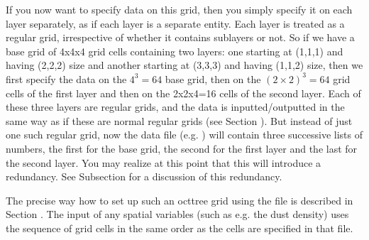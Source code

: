 \documentclass[letterpaper,10pt,english]{sphinxmanual}
\begin{document}
If you now want to specify data on this grid, then you simply specify it on
each layer separately, as if each layer is a separate entity. Each layer is
treated as a regular grid, irrespective of whether it contains sub\sphinxhyphen{}layers
or not. So if we have a base grid of 4x4x4 grid cells containing two layers:
one starting at (1,1,1) and having (2,2,2) size and another starting at
(3,3,3) and having (1,1,2) size, then we first specify the data on the
\(4^3=64\) base grid, then on the \((2\times 2)^3=64\) grid cells of the first
layer and then on the 2x2x4=16 cells of the second layer. Each of these
three layers are regular grids, and the data is inputted/outputted in
the same way as if these are normal regular grids (see Section
{\hyperref[\detokenize{gridding:sec-regular-grid}]{}}). But instead of just one such regular grid, now
the data file (e.g. ) will contain three
successive lists of numbers, the first for the base grid, the second for
the first layer and the last for the second layer. You may realize at this
point that this will introduce a redundancy. See Subsection
{\hyperref[\detokenize{gridding:sec-layer-amr-redundancy}]{}} for a discussion of this redundancy.

The precise way how to set up such an oct\sphinxhyphen{}tree grid using the 
file is described in Section {\hyperref[\detokenize{inputoutputfiles:sec-amr-grid-layered}]{}}.  The input of any
spatial variables (such as e.g. the dust density) uses the sequence of grid
cells in the same order as the cells are specified in that 
file.
\end{document}
